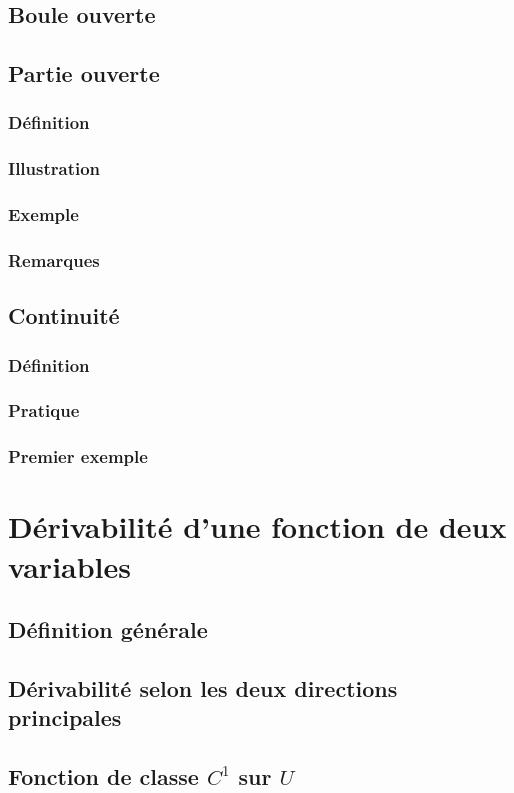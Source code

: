 \documentclass[12pt,a4paper,french]{book}
\begin{document}
		\subsection{Boule ouverte}
		\subsection{Partie ouverte}
			\subsubsection{Définition}
			\subsubsection{Illustration}
			\subsubsection{Exemple}
			\subsubsection{Remarques}
		\subsection{Continuité}
			\subsubsection{Définition}
			\subsubsection{Pratique}
			\subsubsection{Premier exemple}
	\section{Dérivabilité d'une fonction de deux variables}
		\subsection{Définition générale}
		\subsection{Dérivabilité selon les deux directions principales}
		\subsection{Fonction de classe $C^{1}$ sur $U$}
\end{document}
